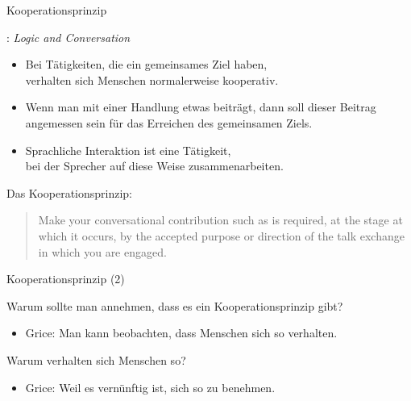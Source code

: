 \begin{frame}{Kooperationsprinzip}

\cite{Grice1975}: \textit{Logic and Conversation}


\begin{itemize}
\item Bei Tätigkeiten, die ein gemeinsames Ziel haben,\\
      verhalten sich Menschen normalerweise kooperativ.
\pause
\item Wenn man mit einer Handlung etwas beiträgt, dann soll dieser Beitrag angemessen sein für das Erreichen des gemeinsamen Ziels.
\pause
\item Sprachliche Interaktion ist eine Tätigkeit, \\
      bei der Sprecher auf diese Weise zusammenarbeiten.
\end{itemize}

\pause
Das Kooperationsprinzip:

\begin{quote}
  Make your conversational contribution such as is required, at the stage at which it occurs, by the accepted purpose or direction of the talk exchange in which you are engaged.
\end{quote}
  
\end{frame}



\begin{frame}{Kooperationsprinzip (2)}

Warum sollte man annehmen, dass es ein Kooperationsprinzip gibt?
 \begin{itemize}
     \item Grice: Man kann beobachten, dass Menschen sich so verhalten.
  \end{itemize}
\pause

Warum verhalten sich Menschen so?
  \begin{itemize}
    \item Grice: Weil es vernünftig ist, sich so zu benehmen.
\end{itemize}
\end{frame}



